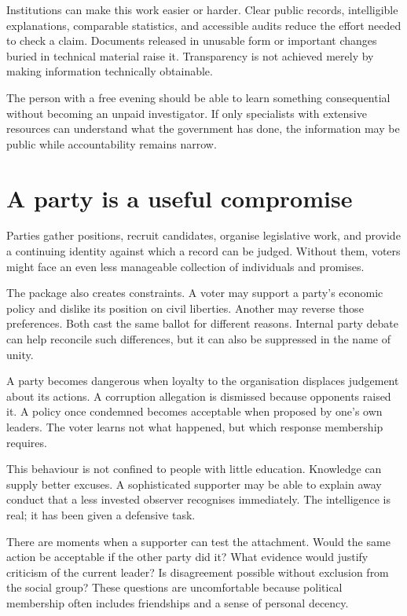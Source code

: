 \documentclass[12pt,a4paper]{book}
\begin{document}
Institutions can make this work easier or harder. Clear public records, intelligible explanations, comparable statistics, and accessible audits reduce the effort needed to check a claim. Documents released in unusable form or important changes buried in technical material raise it. Transparency is not achieved merely by making information technically obtainable.

The person with a free evening should be able to learn something consequential without becoming an unpaid investigator. If only specialists with extensive resources can understand what the government has done, the information may be public while accountability remains narrow.

\section*{A party is a useful compromise}

Parties gather positions, recruit candidates, organise legislative work, and provide a continuing identity against which a record can be judged. Without them, voters might face an even less manageable collection of individuals and promises.

The package also creates constraints. A voter may support a party's economic policy and dislike its position on civil liberties. Another may reverse those preferences. Both cast the same ballot for different reasons. Internal party debate can help reconcile such differences, but it can also be suppressed in the name of unity.

A party becomes dangerous when loyalty to the organisation displaces judgement about its actions. A corruption allegation is dismissed because opponents raised it. A policy once condemned becomes acceptable when proposed by one's own leaders. The voter learns not what happened, but which response membership requires.

This behaviour is not confined to people with little education. Knowledge can supply better excuses. A sophisticated supporter may be able to explain away conduct that a less invested observer recognises immediately. The intelligence is real; it has been given a defensive task.

There are moments when a supporter can test the attachment. Would the same action be acceptable if the other party did it? What evidence would justify criticism of the current leader? Is disagreement possible without exclusion from the social group? These questions are uncomfortable because political membership often includes friendships and a sense of personal decency.
\end{document}
